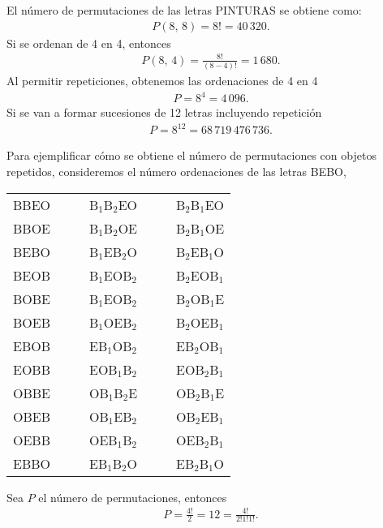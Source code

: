 \begin{myexample}
    El número de permutaciones de las letras PINTURAS se obtiene como:
    \begin{align*}
        P(8, \, 8) = 8! = 40 \, 320.
    \end{align*}
    Si se ordenan de 4 en 4, entonces
    \begin{align*}
        P(8, \, 4) = \frac{8!}{(8-4)!} = 1 \, 680.
    \end{align*}
    Al permitir repeticiones, obtenemos las ordenaciones de 4 en 4
    \begin{align*}
        P = 8^4 = 4 \, 096.
    \end{align*}
    Si se van a formar sucesiones de 12 letras incluyendo repetición
    \begin{align*}
        P = 8^{12} = 68 \, 719 \, 476 \, 736.
    \end{align*}
\end{myexample}

\begin{myexample}
    Para ejemplificar cómo se obtiene el número de permutaciones con objetos repetidos, consideremos el número ordenaciones de las letras BEBO,
    \begin{center}
        \begin{tabular}{lllllll}
            BBEO & & & B$_1$B$_2$EO & & & B$_2$B$_1$EO \\
            BBOE & & & B$_1$B$_2$OE & & & B$_2$B$_1$OE \\
            BEBO & & & B$_1$EB$_2$O & & & B$_2$EB$_1$O \\
            BEOB & & & B$_1$EOB$_2$ & & & B$_2$EOB$_1$ \\
            BOBE & & & B$_1$EOB$_2$ & & & B$_2$OB$_1$E \\
            BOEB & & & B$_1$OEB$_2$ & & & B$_2$OEB$_1$ \\
            EBOB & & & EB$_1$OB$_2$ & & & EB$_2$OB$_1$ \\
            EOBB & & & EOB$_1$B$_2$ & & & EOB$_2$B$_1$ \\
            OBBE & & & OB$_1$B$_2$E & & & OB$_2$B$_1$E \\
            OBEB & & & OB$_1$EB$_2$ & & & OB$_2$EB$_1$ \\
            OEBB & & & OEB$_1$B$_2$ & & & OEB$_2$B$_1$ \\
            EBBO & & & EB$_1$B$_2$O & & & EB$_2$B$_1$O
        \end{tabular}
    \end{center}
    Sea $P$ el número de permutaciones, entonces
    \begin{align*}
        P = \frac{4!}{2} = 12 = \frac{4!}{2!1!1!}.
    \end{align*}
\end{myexample}

